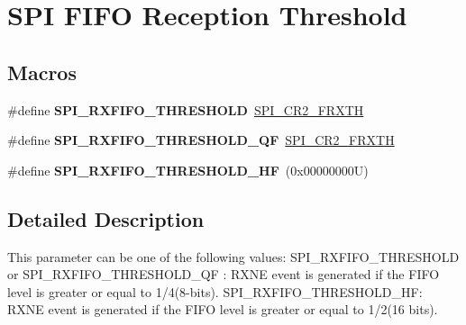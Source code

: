 \hypertarget{group___s_p_i___f_i_f_o__reception__threshold}{}\section{S\+PI F\+I\+FO Reception Threshold}
\label{group___s_p_i___f_i_f_o__reception__threshold}
\subsection*{Macros}
\begin{DoxyCompactItemize}
\item 
\mbox{\label{group___s_p_i___f_i_f_o__reception__threshold_gad59c107b3fee1ca1d6366b4b3c995c88}} 
\#define {\bfseries S\+P\+I\+\_\+\+R\+X\+F\+I\+F\+O\+\_\+\+T\+H\+R\+E\+S\+H\+O\+LD}~\mbox{\hyperlink{group___peripheral___registers___bits___definition_ga6e02994914afef4270508bc3219db477}{S\+P\+I\+\_\+\+C\+R2\+\_\+\+F\+R\+X\+TH}}
\item 
\mbox{\label{group___s_p_i___f_i_f_o__reception__threshold_ga89c3d57e576b7855dc34df26fd6b9972}} 
\#define {\bfseries S\+P\+I\+\_\+\+R\+X\+F\+I\+F\+O\+\_\+\+T\+H\+R\+E\+S\+H\+O\+L\+D\+\_\+\+QF}~\mbox{\hyperlink{group___peripheral___registers___bits___definition_ga6e02994914afef4270508bc3219db477}{S\+P\+I\+\_\+\+C\+R2\+\_\+\+F\+R\+X\+TH}}
\item 
\mbox{\label{group___s_p_i___f_i_f_o__reception__threshold_ga6e9184eadc370323383fe560209d1084}} 
\#define {\bfseries S\+P\+I\+\_\+\+R\+X\+F\+I\+F\+O\+\_\+\+T\+H\+R\+E\+S\+H\+O\+L\+D\+\_\+\+HF}~(0x00000000\+U)
\end{DoxyCompactItemize}


\subsection{Detailed Description}
This parameter can be one of the following values\+: S\+P\+I\+\_\+\+R\+X\+F\+I\+F\+O\+\_\+\+T\+H\+R\+E\+S\+H\+O\+LD or S\+P\+I\+\_\+\+R\+X\+F\+I\+F\+O\+\_\+\+T\+H\+R\+E\+S\+H\+O\+L\+D\+\_\+\+QF \+: R\+X\+NE event is generated if the F\+I\+FO level is greater or equal to 1/4(8-\/bits). S\+P\+I\+\_\+\+R\+X\+F\+I\+F\+O\+\_\+\+T\+H\+R\+E\+S\+H\+O\+L\+D\+\_\+\+HF\+: R\+X\+NE event is generated if the F\+I\+FO level is greater or equal to 1/2(16 bits). 
